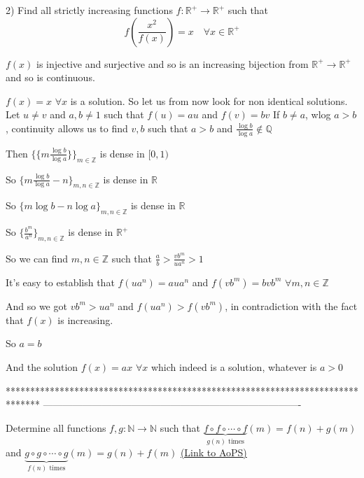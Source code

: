 \begin{solution}
	\begin{tcolorbox}2) Find all strictly increasing functions $f:\mathbb{R}^+\to\mathbb{R}^+$ such that
\[f ( \frac{x^2}{f(x)}  )=x \quad \forall x\in \mathbb{R}^+\]\end{tcolorbox}
$f(x)$ is injective and surjective and so is an increasing bijection from $\mathbb R^+\to\mathbb R^+$ and so is continuous.

$f(x)=x$ $\forall x$ is a solution. So let us from now look for non identical solutions.
Let $u\ne v$ and $a,b\ne 1$ such that $f(u)=au$ and $f(v)=bv$
If $b\ne a$, wlog $a>b$, continuity allows us to find $v,b$ such that $a>b$ and $\frac{\log b}{\log a}\notin\mathbb Q$

Then $\{\{m\frac{\log b}{\log a}\}\}_{m\in\mathbb Z}$ is dense in $[0,1)$

So $\{m\frac{\log b}{\log a}-n\}_{m,n\in\mathbb Z}$ is dense in $\mathbb R$

So ${\{m\log b}-n\log a\}_{m,n\in\mathbb Z}$ is dense in $\mathbb R$

So $\{\frac{b^m}{a^n}\}_{m,n\in\mathbb Z}$ is dense in $\mathbb R^+$

So we can find $m,n\in\mathbb Z$ such that $\frac ab>\frac {vb^m}{ua^n}>1$

It's easy to establish that $f(ua^n)=aua^n$  and $f(vb^m)=bvb^m$ $\forall m,n\in\mathbb Z$

And so we got $vb^m>ua^n$ and $f(ua^n)>f(vb^m)$, in contradiction with the fact that $f(x)$ is increasing.

So $a=b$

And the solution $\boxed{f(x)=ax}$ $\forall x$ which indeed is a solution, whatever is $a>0$
\end{solution}
*******************************************************************************
-------------------------------------------------------------------------------

\begin{problem}
	Determine all functions $ f,g:\mathbb{N}\to\mathbb{N} $ such that $ \underbrace{f{\circ}f{\circ}\cdots{\circ}f}_{g(n)\textrm{ times}}(m)=f(n)+g(m) $ and  $ \underbrace{g{\circ}g{\circ}\cdots{\circ}g}_{f(n)\textrm{ times}}(m)=g(n)+f(m) $
	\flushright \href{https://artofproblemsolving.com/community/c6h562146}{(Link to AoPS)}
\end{problem}



